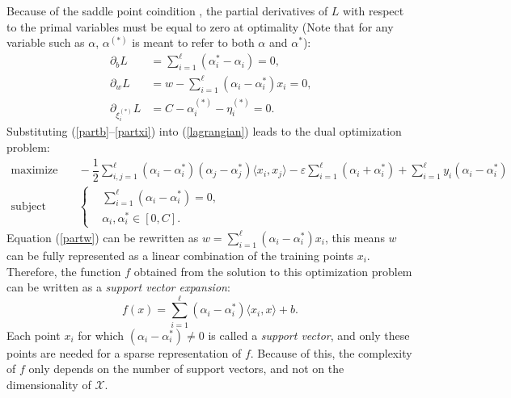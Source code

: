 \documentclass[12pt]{report}
\begin{document}
Because of the saddle point coindition \cite{fletcher80}, the partial derivatives of $ L $ with respect to the primal variables must be equal to zero at optimality (Note that for any variable such as $\alpha$, $\alpha^{(*)}$ is meant to refer to both $\alpha$ and $\alpha^{*}$):
\begin{align}
\label{partb}
\partial_{b}L &= \sum_{i=1}^{\ell}(\alpha_{i}^{*} - \alpha_{i}) = 0 \text{,}\\
\label{partw}
\partial_{w}L &= w - \sum_{i=1}^{\ell}(\alpha_{i} - \alpha_{i}^{*})x_{i} = 0 \text{,}\\
\label{partxi}
\partial_{\xi_{i}^{(*)}}L &= C - \alpha_{i}^{(*)} - \eta_{i}^{(*)} = 0 \text{.}
\end{align}
Substituting (\ref{partb}--\ref{partxi}) into (\ref{lagrangian}) leads to the dual optimization problem:
\begin{equation} \label{smargdual}
\begin{split}
\text{maximize} &\quad
-\dfrac{1}{2}\sum_{i,j=1}^{\ell}(\alpha_{i} - \alpha_{i}^{*})(\alpha_{j} - \alpha_{j}^{*})\langle x_{i},x_{j} \rangle -\varepsilon\sum_{i=1}^{\ell}(\alpha_{i} + \alpha_{i}^{*}) + \sum_{i=1}^{\ell}y_{i}(\alpha_{i}-\alpha_{i}^{*}) \\
\text{subject to} &\quad \left\{\begin{split}
&\sum_{i=1}^{\ell}(\alpha_{i} - \alpha_{i}^{*}) = 0 \text{,}\\
&\alpha_{i},\alpha_{i}^{*} \in [0,C] \text{.}
\end{split}\right.
\end{split}
\end{equation}
Equation (\ref{partw}) can be rewritten as $ w = \sum_{i=1}^{\ell}(\alpha_{i}-\alpha_{i}^{*})x_{i} $, this means $ w $ can be fully represented as a linear combination of the training points $ x_{i} $. Therefore, the function $ f $ obtained from the solution to this optimization problem can be written as a \textit{support vector expansion}:
\begin{equation} \label{fsvexp}
f(x) = \sum_{i=1}^{\ell}(\alpha_{i}-\alpha_{i}^{*})\langle x_{i},x\rangle + b \text{.}
\end{equation}
Each point $ x_{i} $ for which $ (\alpha_{i}-\alpha_{i}^{*}) \neq 0 $ is called a \textit{support vector}, and only these points are needed for a sparse representation of $ f $.  Because of this, the complexity of $ f $ only depends on the number of support vectors, and not on the dimensionality of $ \mathcal{X} $.
\end{document}
